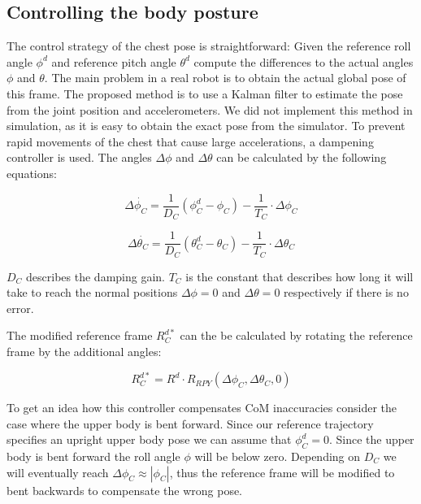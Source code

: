 \documentclass[english,ngerman]{KITreprt}
\begin{document}
\subsection{Controlling the body
posture}\label{controlling-the-body-posture}

The control strategy of the chest pose is straightforward: Given the
reference roll angle $\phi^d$ and reference pitch angle $\theta^d$
compute the differences to the actual angles $\phi$ and $\theta$. The
main problem in a real robot is to obtain the actual global pose of this
frame. The proposed method is to use a Kalman filter to estimate the
pose from the joint position and accelerometers. We did not implement
this method in simulation, as it is easy to obtain the exact pose from
the simulator. To prevent rapid movements of the chest that cause large
accelerations, a dampening controller is used. The angles $\Delta \phi$
and $\Delta \theta$ can be calculated by the following equations:

\begin{equation} \label{eq:chest-dampening-roll}
\Delta \dot{\phi_C} = \frac{1}{D_C} (\phi_C^d - \phi_C) - \frac{1}{T_C} \cdot \Delta \phi_C
\end{equation}

\begin{equation} \label{eq:chest-dampening-pitch}
\Delta \dot{\theta_C} = \frac{1}{D_C} (\theta_C^d - \theta_C) - \frac{1}{T_C} \cdot \Delta \theta_C
\end{equation}

$D_C$ describes the damping gain. $T_C$ is the constant that describes
how long it will take to reach the normal positions $\Delta \phi = 0$
and $\Delta \theta = 0$ respectively if there is no error.

The modified reference frame $R^{d*}_C$ can the be calculated by
rotating the reference frame by the additional angles:

\begin{equation}
R^{d*}_C = R^d \cdot R_{RPY}(\Delta \phi_C, \Delta \theta_C, 0)
\end{equation}

To get an idea how this controller compensates CoM inaccuracies consider
the case where the upper body is bent forward. Since our reference
trajectory specifies an upright upper body pose we can assume that
$\phi_C^d = 0$. Since the upper body is bent forward the roll angle
$\phi$ will be below zero. Depending on $D_C$ we will eventually reach
$\Delta \phi_C \approx |\phi_C|$, thus the reference frame will be
modified to bent backwards to compensate the wrong pose.
\end{document}
